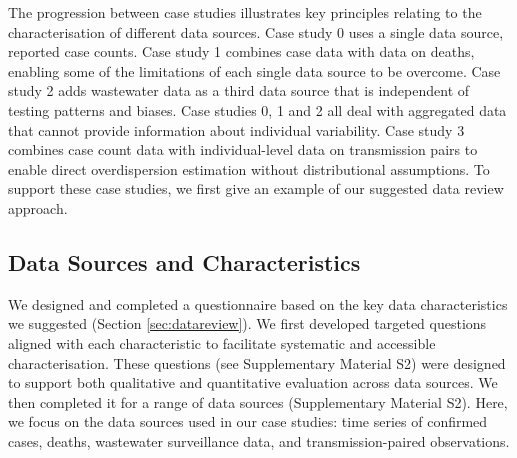 \documentclass{article}
\begin{document}
The progression between case studies illustrates key principles relating to the characterisation of different data sources. Case study 0 uses a single data source, reported case counts. Case study 1 combines case data with data on deaths, enabling some of the limitations of each single data source to be overcome. Case study 2 adds wastewater data as a third data source that is independent of testing patterns and biases. Case studies 0, 1 and 2 all deal with aggregated data that cannot provide information about individual variability. Case study 3 combines case count data with individual-level data on transmission pairs to enable direct overdispersion estimation without distributional assumptions.
To support these case studies, we first give an example of our suggested data review approach.

\subsection{Data Sources and Characteristics}

We designed and completed a questionnaire based on the key data characteristics we suggested (Section \ref{sec:datareview}). We first developed targeted questions aligned with each characteristic to facilitate systematic and accessible characterisation. These questions (see Supplementary Material S2) were designed to support both qualitative and quantitative evaluation across data sources. We then completed it for a range of data sources (Supplementary Material S2). Here, we focus on the data sources used in our case studies: time series of confirmed cases, deaths, wastewater surveillance data, and transmission-paired observations.
\end{document}
